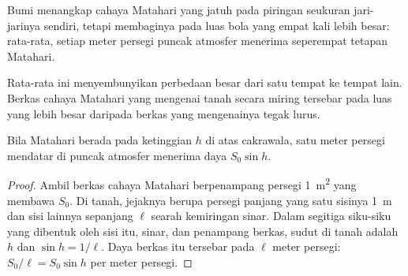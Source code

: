 \begin{omfigure}

{\small Bumi menangkap cahaya Matahari yang jatuh pada piringan seukuran
jari-jarinya sendiri, tetapi membaginya pada luas bola yang empat kali lebih
besar: rata-rata, setiap meter persegi puncak atmosfer menerima seperempat
tetapan Matahari.}
\end{omfigure}

Rata-rata ini menyembunyikan perbedaan besar dari satu tempat ke tempat lain.
Berkas cahaya Matahari yang mengenai tanah secara miring tersebar pada luas
yang lebih besar daripada berkas yang mengenainya tegak lurus.

\begin{proposition}\label{prop:g10:earth-energy-budget:height}
Bila Matahari berada pada ketinggian $h$ di atas cakrawala, satu meter persegi
mendatar di puncak atmosfer menerima daya $S_0 \sin h$.
\end{proposition}

\begin{proof}
Ambil berkas cahaya Matahari berpenampang persegi \qty{1}{m^2} yang membawa
$S_0$. Di tanah, jejaknya berupa persegi panjang yang satu sisinya \qty{1}{m}
dan sisi lainnya sepanjang $\ell$ searah kemiringan sinar. Dalam segitiga
siku-siku yang dibentuk oleh sisi itu, sinar, dan penampang berkas, sudut di
tanah adalah $h$ dan $\sin h = 1/\ell$. Daya berkas itu tersebar pada $\ell$
meter persegi: $S_0/\ell = S_0 \sin h$ per meter persegi.
\end{proof}

